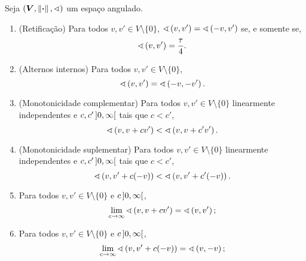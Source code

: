 \cleardoublepage


\begin{proposition}
Seja $(\bm V, \left\Vert{\bm{\cdot}}\right\Vert,\sphericalangle)$ um espaço angulado.
	\begin{enumerate}
		\item (Retificação) Para todos $v,v' \in V \setminus \{0\}$, $\sphericalangle\left({v},{v'}\right)=\sphericalangle\left({-v},{v'}\right)$ se, e somente se,
			\begin{equation*}
				\sphericalangle\left({v},{v'}\right) = \frac{\tau}{4}.
			\end{equation*}
		
		\item (Alternos internos) Para todos $v,v' \in V \setminus \{0\}$,
			\begin{equation*}
				\sphericalangle\left({v},{v'}\right) = \sphericalangle\left({-v},{-v'}\right).
			\end{equation*}
		
		\item (Monotonicidade complementar) Para todos $v,v' \in V \setminus \{0\}$ linearmente independentes e $c,c' \left]{0},{\infty}\right[$ tais que $c < c'$,
		\begin{equation*}
			\sphericalangle\left({v},{v+cv'}\right) < \sphericalangle\left({v},{v+c'v'}\right).
		\end{equation*}
		
		\item (Monotonicidade suplementar) Para todos $v,v' \in V \setminus \{0\}$ linearmente independentes e $c,c' \left]{0},{\infty}\right[$ tais que $c < c'$,
			\begin{equation*}
				\sphericalangle\left({v},{v'+c(-v)}\right) < \sphericalangle\left({v},{v'+c'(-v)}\right).
			\end{equation*}

		\item Para todos $v,v' \in V \setminus \{0\}$ e $c \left]{0},{\infty}\right[$,
			\begin{equation*}
				\lim_{c \to \infty} \sphericalangle\left({v},{v+cv'}\right) = \sphericalangle\left({v},{v'}\right);
			\end{equation*}
		\item Para todos $v,v' \in V \setminus \{0\}$ e $c \left]{0},{\infty}\right[$,
		\begin{equation*}
			\lim_{c \to \infty} \sphericalangle\left({v},{v'+c(-v)}\right) = \sphericalangle\left({v},{-v}\right);
		\end{equation*}


\end{enumerate}
\end{proposition}
